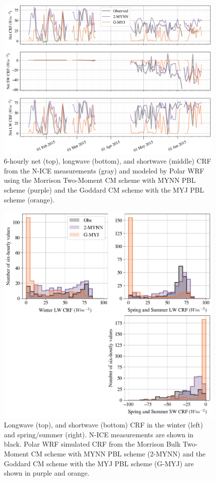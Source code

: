 \begin{figure}[t]
    \centering
    \includegraphics[width=1\linewidth]{figures/chapter4/CRF_TS.png}
    \caption[Time series of cloud radiative forcing in two WRF model runs.]{6-hourly net (top), longwave (bottom), and shortwave (middle) CRF from the N-ICE measurements (gray) and modeled by Polar WRF using the Morrison Two-Moment CM scheme with MYNN PBL scheme (purple) and the Goddard CM scheme with the MYJ PBL scheme (orange).}
    \label{fig:wrf_crf_all}
\end{figure}
\begin{figure}[p!]
    \centering
    \includegraphics[width=1\linewidth]{figures/chapter4/CRF_Histos.png}
    \caption[Histograms of cloud radiative forcing in two WRF model runs.]{Longwave (top), and shortwave (bottom) CRF in the winter (left) and spring/summer (right). N-ICE measurements  are shown in black. Polar WRF simulated CRF from the Morrison Bulk Two-Moment CM scheme with MYNN PBL scheme (2-MYNN) and the Goddard CM scheme with the MYJ PBL scheme (G-MYJ) are shown in purple and orange.}
    \label{wrf:fig_crf_his}
\end{figure}

